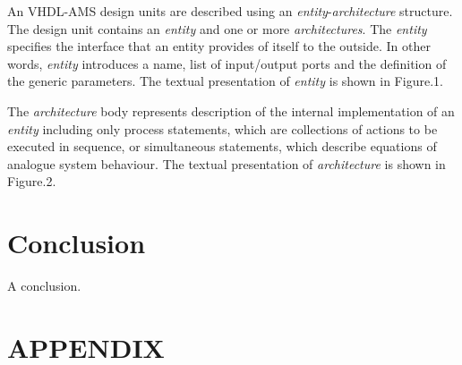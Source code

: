 \documentclass{article}
\newcommand{\todo}{\textbf{TODO:}}
\newcommand{\ent}{\emph{entity}\xspace}
\newcommand{\arch}{\emph{architecture}\xspace}
\newcommand{\archs}{\emph{architectures}\xspace}
\begin{document}
An VHDL-AMS design units are described using an \ent-\arch structure. 
The design unit contains an \ent and one or more \archs. 
The \ent specifies the interface that an entity provides of itself 
to the outside. In other words, \ent introduces a name, list of 
input/output ports and the definition of the generic parameters. 
The textual presentation of \ent is shown in Figure.1. 

 
The \arch body represents description of the internal implementation 
of an \ent including only process statements, which are collections 
of actions to be executed in sequence, or simultaneous statements, 
which describe equations of analogue system behaviour. 
The textual presentation of \arch is shown in Figure.2.

 


\section{Conclusion}

A conclusion.





\appendix
\section {APPENDIX}



\end{document}
